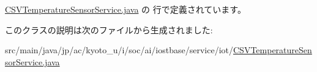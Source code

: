  \hyperlink{_c_s_v_temperature_sensor_service_8java_source}{C\-S\-V\-Temperature\-Sensor\-Service.\-java} の  行で定義されています。



このクラスの説明は次のファイルから生成されました\-:\begin{DoxyCompactItemize}
\item 
src/main/java/jp/ac/kyoto\-\_\-u/i/soc/ai/iostbase/service/iot/\hyperlink{_c_s_v_temperature_sensor_service_8java}{C\-S\-V\-Temperature\-Sensor\-Service.\-java}\end{DoxyCompactItemize}
